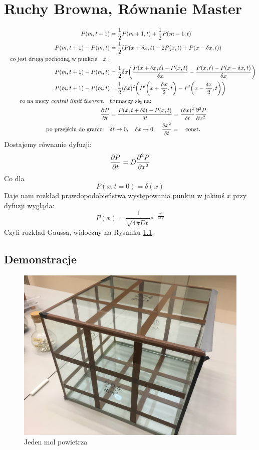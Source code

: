 \documentclass[12pt,a4paper]{report}
\newenvironment{lecture}[1]{\par\medskip
   \noindent\chapter{#1} \rmfamily}{\medskip}
\begin{document}
\begin{lecture}{Ruchy Browna, Równanie Master}
\begin{align*}
    P(m, t+1) &= \frac12 P(m+1, t) + \frac12 P(m-1, t )\\
    P(m, t+1) - P(m, t) &= \frac12(P(x + \delta x, t) - 2P(x, t) + P(x - \delta x, t))\\ 
    \qq{co jest drugą pochodną w punkcie}x:&\\
    P(m, t+1) - P(m, t) &= \frac12\delta x\qty(\frac{P(x + \delta x, t) - P(x, t)}{\delta x} - \frac{P(x, t) - P(x - \delta x, t)}{\delta x})\\
    P(m, t+1) - P(m, t) &= \frac12(\delta x)^2\qty(P'\qty(x + \frac{\delta x}{2}, t) - P'\qty(x - \frac{\delta x}{2}, t))\\
    \qq{co na mocy \textit{central limit theorem}}& \text{tłumaczy się na:}\\
    \pdv{P}{t} &= \frac{P(x, t+\delta t) - P(x, t)}{\delta t} = \frac{(\delta x)^2}{\delta t}\pdv[2]{P}{x}\\
    \qq{po przejściu do granic:} &\delta t \to 0\qc \delta x \to 0\qc \frac{\delta x^2}{\delta t} = \qq{const.}\\
\end{align*}
Dostajemy równanie dyfuzji:
\begin{equation}
    \pdv{P}{t} = D \pdv[2]{P}{x}
    \label{eq:lec_2:dyfuzja}
\end{equation}
Co dla
\[
    P(x, t=0) = \delta(x)
\]
Daje nam rozkład prawdopodobieństwa występowania punktu w jakimś $x$ przy dyfuzji wygląda:
\begin{equation}
    P(x) = \frac{1}{\sqrt{4 \pi D t}} e^{-\frac{x^2}{4 D t}}
    \label{eq:lec_2:rozklad_gauss}
\end{equation}
Czyli rozkład Gaussa, widoczny na Rysunku \ref{fig:lec_2:mol_pow}.

\section{Demonstracje}
\begin{figure}[!ht]
    \centering
    \includegraphics[width=0.5\linewidth]{Wyk_2_Rys_3.JPG}
    \caption{Jeden mol powietrza}
    \label{fig:lec_2:mol_pow}
\end{figure}


\end{lecture}
\end{document}
